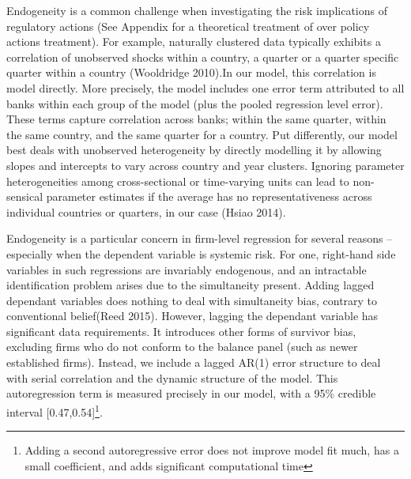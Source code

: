 \documentclass[
  10pt,
]{article}
\begin{document}
Endogeneity is a common challenge when investigating the risk
implications of regulatory actions (See Appendix for a theoretical
treatment of over policy actions treatment). For example, naturally
clustered data typically exhibits a correlation of unobserved shocks
within a country, a quarter or a quarter specific quarter within a
country (Wooldridge 2010).In our model, this correlation is model
directly. More precisely, the model includes one error term attributed
to all banks within each group of the model (plus the pooled regression
level error). These terms capture correlation across banks; within the
same quarter, within the same country, and the same quarter for a
country. Put differently, our model best deals with unobserved
heterogeneity by directly modelling it by allowing slopes and intercepts
to vary across country and year clusters. Ignoring parameter
heterogeneities among cross-sectional or time-varying units can lead to
non-sensical parameter estimates if the average has no
representativeness across individual countries or quarters, in our case
(Hsiao 2014).

Endogeneity is a particular concern in firm-level regression for several
reasons -- especially when the dependent variable is systemic risk. For
one, right-hand side variables in such regressions are invariably
endogenous, and an intractable identification problem arises due to the
simultaneity present. Adding lagged dependant variables does nothing to
deal with simultaneity bias, contrary to conventional belief(Reed 2015).
However, lagging the dependant variable has significant data
requirements. It introduces other forms of survivor bias, excluding
firms who do not conform to the balance panel (such as newer established
firms). Instead, we include a lagged AR(1) error structure to deal with
serial correlation and the dynamic structure of the model. This
autoregression term is measured precisely in our model, with a 95\%
credible interval {[}0.47,0.54{]}\footnote{Adding a second
  autoregressive error does not improve model fit much, has a small
  coefficient, and adds significant computational time}.
\end{document}
